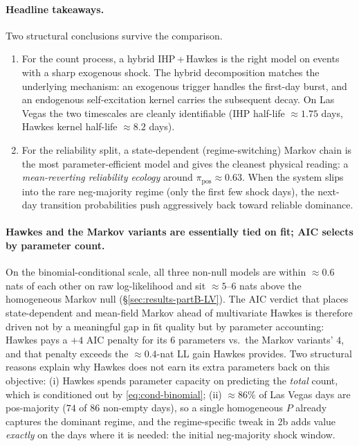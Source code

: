 \documentclass[11pt]{article}
\newcommand{\pipos}{\pi_{\mathrm{pos}}}
\begin{document}
\paragraph{Headline takeaways.}
Two structural conclusions survive the comparison.
\begin{enumerate}
  \item For the count process, a hybrid IHP\,+\,Hawkes is the right model on
        events with a sharp exogenous shock. The hybrid decomposition
        matches the underlying mechanism: an exogenous trigger handles the
        first-day burst, and an endogenous self-excitation kernel carries
        the subsequent decay. On Las Vegas the two timescales are
        cleanly identifiable
        (IHP half-life $\approx 1.75$ days, Hawkes kernel half-life
        $\approx 8.2$ days).
  \item For the reliability split, a state-dependent (regime-switching)
        Markov chain is the most parameter-efficient model and gives the
        cleanest physical reading: a \emph{mean-reverting reliability
        ecology} around $\pipos\approx 0.63$. When the system slips into the
        rare neg-majority regime (only the first few shock days), the
        next-day transition probabilities push aggressively back toward
        reliable dominance.
\end{enumerate}

\paragraph{Hawkes and the Markov variants are essentially tied on fit; AIC selects by parameter count.}
On the binomial-conditional scale, all three non-null models are within
$\approx 0.6$ nats of each other on raw log-likelihood and sit
$\approx 5\text{--}6$ nats above the homogeneous Markov null
(\S\ref{sec:results-partB-LV}). The AIC verdict that places
state-dependent and mean-field Markov ahead of multivariate Hawkes is
therefore driven not by a meaningful gap in fit quality but by parameter
accounting: Hawkes pays a $+4$ AIC penalty for its $6$ parameters vs.\
the Markov variants' $4$, and that penalty exceeds the
$\approx 0.4$-nat LL gain Hawkes provides. Two structural reasons explain
why Hawkes does not earn its extra parameters back on this objective:
(i) Hawkes spends parameter capacity on predicting the \emph{total} count,
which is conditioned out by \eqref{eq:cond-binomial};
(ii) $\approx\!86\%$ of Las Vegas days are pos-majority
($74$ of $86$ non-empty days), so a single homogeneous $P$ already
captures the dominant regime, and the regime-specific tweak in 2b adds
value \emph{exactly} on the days where it is needed: the initial
neg-majority shock window. 
\end{document}
